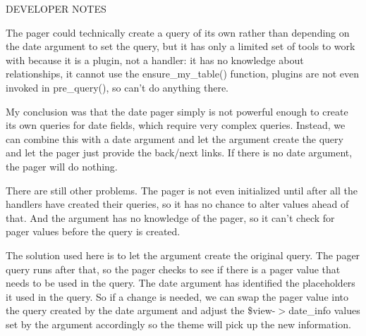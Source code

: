 DEVELOPER NOTES

The pager could technically create a query of its own rather than depending on the date argument to set the query, but it has only a limited set of tools to work with because it is a plugin, not a handler: it has no knowledge about relationships, it cannot use the ensure\_\-my\_\-table() function, plugins are not even invoked in pre\_\-query(), so can't do anything there.

My conclusion was that the date pager simply is not powerful enough to create its own queries for date fields, which require very complex queries. Instead, we can combine this with a date argument and let the argument create the query and let the pager just provide the back/next links. If there is no date argument, the pager will do nothing.

There are still other problems. The pager is not even initialized until after all the handlers have created their queries, so it has no chance to alter values ahead of that. And the argument has no knowledge of the pager, so it can't check for pager values before the query is created.

The solution used here is to let the argument create the original query. The pager query runs after that, so the pager checks to see if there is a pager value that needs to be used in the query. The date argument has identified the placeholders it used in the query. So if a change is needed, we can swap the pager value into the query created by the date argument and adjust the \$view-\/$>$date\_\-info values set by the argument accordingly so the theme will pick up the new information. 